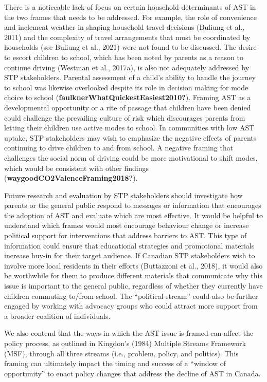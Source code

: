 \documentclass[]{elsarticle} %
\begin{document}
There is a noticeable lack of focus on certain household determinants of
AST in the two frames that needs to be addressed. For example, the role
of convenience and inclement weather in shaping household travel
decisions (Buliung et al., 2011) and the complexity of travel
arrangements that must be coordinated by households (see Buliung et al.,
2021) were not found to be discussed. The desire to escort children to
school, which has been noted by parents as a reason to continue driving
(Westman et al., 2017a), is also not adequately addressed by STP
stakeholders. Parental assessment of a child's ability to handle the
journey to school was likewise overlooked despite its role in decision
making for mode choice to school
(\textbf{faulknerWhatQuickestEasiest2010?}). Framing AST as a
developmental opportunity or a rite of passage that children have been
denied could challenge the prevailing culture of risk which discourages
parents from letting their children use active modes to school. In
communities with low AST uptake, STP stakeholders may wish to emphasize
the negative effects of parents continuing to drive children to and from
school. A negative framing that challenges the social norm of driving
could be more motivational to shift modes, which would be consistent
with other findings (\textbf{waygoodCO2ValenceFraming2018?}).

Future research and evaluation by STP stakeholders should investigate
how parents or the general public respond to messages or information
that encourages the adoption of AST and evaluate which are most
effective. It would be helpful to understand which frames would most
encourage behaviour change or increase political support for
interventions that address barriers to AST. This type of information
could ensure that educational strategies and promotional materials
increase buy-in for their target audience. If Canadian STP stakeholders
wish to involve more local residents in their efforts (Buttazzoni et
al., 2018), it would also be worthwhile for them to produce different
materials that communicate why this issue is important to the general
public, regardless of whether they currently have children commuting
to/from school. The ``political stream'' could also be further engaged
by working with advocacy groups who could attract more support from a
broader coalition of individuals.

We also contend that the ways in which the AST issue is framed can
affect the policy process, as outlined in Kingdon's (1984) Multiple
Streams Framework (MSF), through all three streams (i.e., problem,
policy, and politics). This framing can ultimately impact the timing and
success of a ``window of opportunity'' to enact policy changes that
address the decline of AST in Canada.
\end{document}
